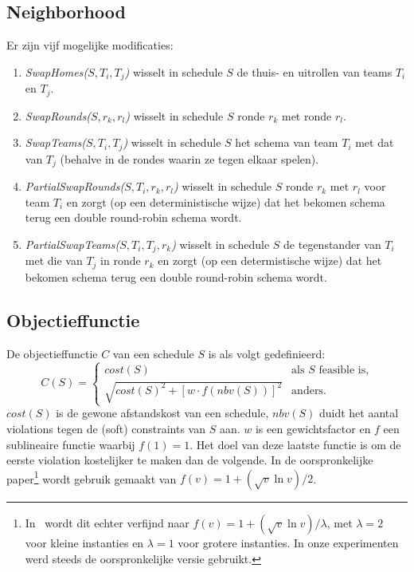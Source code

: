 \documentclass[a4paper,dutch,11pt,]{scrartcl}
\begin{document}
\subsection*{Neighborhood}
Er zijn vijf mogelijke modificaties:
\begin{enumerate}
\item \emph{SwapHomes($S,T_i,T_j$)} wisselt in schedule $S$ de thuis- en uitrollen van teams $T_i$ en $T_j$.
\item \emph{SwapRounds($S,r_k,r_l$)} wisselt in schedule $S$ ronde $r_k$ met ronde $r_l$.
\item \emph{SwapTeams($S,T_i,T_j$)} wisselt in schedule $S$ het schema van team $T_i$ met dat van $T_j$ (behalve in de rondes waarin ze tegen elkaar spelen).
\item \emph{PartialSwapRounds($S,T_i,r_k,r_l$)} wisselt in schedule $S$ ronde $r_k$ met $r_l$ voor team $T_i$ en zorgt (op een deterministische wijze) dat het bekomen schema terug een double round-robin schema wordt.
\item \emph{PartialSwapTeams($S,T_i,T_j,r_k$)} wisselt in schedule $S$ de tegenstander van $T_i$ met die van $T_j$ in ronde $r_k$ en zorgt (op een determistische wijze) dat het bekomen schema terug een double round-robin schema wordt.

\end{enumerate}

\subsection*{Objectieffunctie}
De objectieffunctie $C$ van een schedule $S$ is als volgt gedefinieerd:
\begin{equation*}
  C(S)=%
  \begin{cases}
    cost(S) &\textrm{als $S$ feasible is,} \\
    \sqrt{cost(S)^2 + [w\cdot{}f(nbv(S))]^2} &\textrm{anders}.
  \end{cases}
\end{equation*} $cost(S)$ is de gewone afstandskost van een schedule, $nbv(S)$ duidt het aantal violations tegen de (soft) constraints van $S$ aan. $w$ is een gewichtsfactor en $f$ een sublineaire functie waarbij $f(1)=1$. Het doel van deze laatste functie is om de eerste violation kostelijker te maken dan de volgende. In de oorspronkelijke paper\footnote{In~\cite{paper2} wordt dit echter verfijnd naar $f(v)=1+(\sqrt{v}\ln{v})/\lambda$, met $\lambda=2$ voor kleine instanties en $\lambda=1$ voor grotere instanties. In onze experimenten werd steeds de oorspronkelijke versie gebruikt.} wordt gebruik gemaakt van $f(v)=1+(\sqrt{v}\ln{v})/2$.
\end{document}
